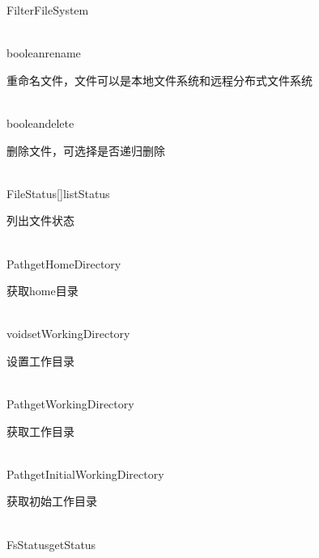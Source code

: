 \begin{XeClass}{FilterFileSystem}
  \begin{XeMethod}{\XePublic\\ }{boolean}{rename}
       
 重命名文件，文件可以是本地文件系统和远程分布式文件系统

  \end{XeMethod}

  \begin{XeMethod}{\XePublic\\ }{boolean}{delete}
       
 删除文件，可选择是否递归删除

  \end{XeMethod}

  \begin{XeMethod}{\XePublic\\ }{FileStatus[]}{listStatus}
       
 列出文件状态

  \end{XeMethod}

  \begin{XeMethod}{\XePublic\\ }{Path}{getHomeDirectory}
       
 获取home目录

  \end{XeMethod}

  \begin{XeMethod}{\XePublic\\ }{void}{setWorkingDirectory}
       
 设置工作目录

  \end{XeMethod}

  \begin{XeMethod}{\XePublic\\ }{Path}{getWorkingDirectory}
       
 获取工作目录

  \end{XeMethod}

  \begin{XeMethod}{\XeProtected\\ }{Path}{getInitialWorkingDirectory}
       
 获取初始工作目录

  \end{XeMethod}

  \begin{XeMethod}{\XePublic\\ }{FsStatus}{getStatus}
       

\end{XeMethod}
\end{XeClass}
